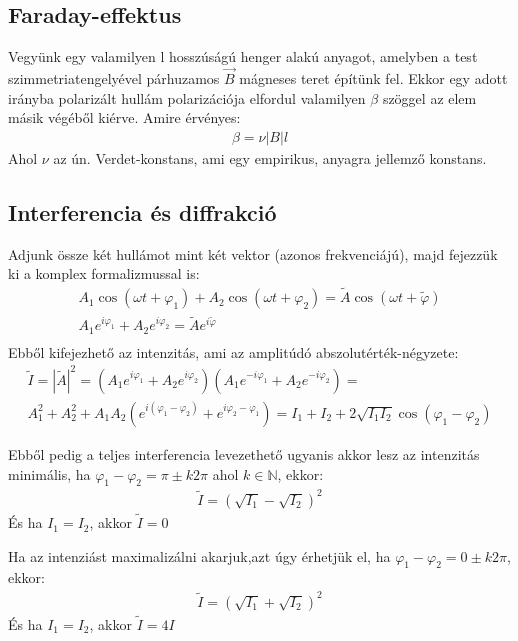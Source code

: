 \documentclass{article}
\begin{document}
\subsection{Faraday-effektus}
Vegyünk egy valamilyen l hosszúságú henger alakú anyagot, amelyben a test szimmetriatengelyével párhuzamos $\vec{B}$ mágneses teret építünk fel. Ekkor egy adott irányba polarizált hullám polarizációja elfordul valamilyen $\beta$ szöggel az elem másik végéből kiérve. Amire érvényes:
\begin{gather*}
\beta = \nu |B| l
\end{gather*}
Ahol $\nu$ az ún. Verdet-konstans, ami egy empirikus, anyagra jellemző konstans.
\subsection{Interferencia és diffrakció}
Adjunk össze két hullámot mint két vektor (azonos frekvenciájú), majd fejezzük ki a komplex formalizmussal is:
\begin{gather*}
A_1 \cos(\omega t + \varphi_1) + A_2 \cos(\omega t + \varphi_2) = \tilde{A} \cos(\omega t + \tilde{\varphi}) \\
A_1 e^{i\varphi_1} + A_2 e^{i\varphi_2} = \tilde{A} e^{i\tilde{\varphi}} \\
\end{gather*}
Ebből kifejezhető az intenzitás, ami az amplitúdó abszolutérték-négyzete:
\begin{gather*}
\tilde{I} = |\tilde{A}|^2 = \left( A_1 e^{i\varphi_1} + A_2 e^{i\varphi_2} \right) \left( A_1 e^{-i\varphi_1} + A_2 e^{-i\varphi_2} \right) = \\
A_1^2 + A_2^2 + A_1A_2  \left(e^{i(\varphi_1-\varphi_2)} + e^{i\varphi_2- \varphi_1}\right) =  I_1 + I_2 + 2\sqrt{I_1I_2}\cos(\varphi_1-\varphi_2)
\end{gather*}

Ebből pedig a teljes interferencia levezethető ugyanis akkor lesz az intenzitás minimális, ha $\varphi_1-\varphi_2 = \pi \pm k2\pi$ ahol $k \in \mathbb{N}$, ekkor:
\begin{gather*}
\tilde{I} = (\sqrt{I_1}-\sqrt{I_2})^2
\end{gather*}
És ha $I_1=I_2$, akkor $\tilde{I} = 0$

Ha az intenziást maximalizálni akarjuk,azt úgy érhetjük el, ha $\varphi_1-\varphi_2 = 0 \pm k2\pi$, ekkor:
\begin{gather*}
\tilde{I} = (\sqrt{I_1} + \sqrt{I_2})^2
\end{gather*}
És ha $I_1=I_2$, akkor $\tilde{I} = 4I$
\end{document}
